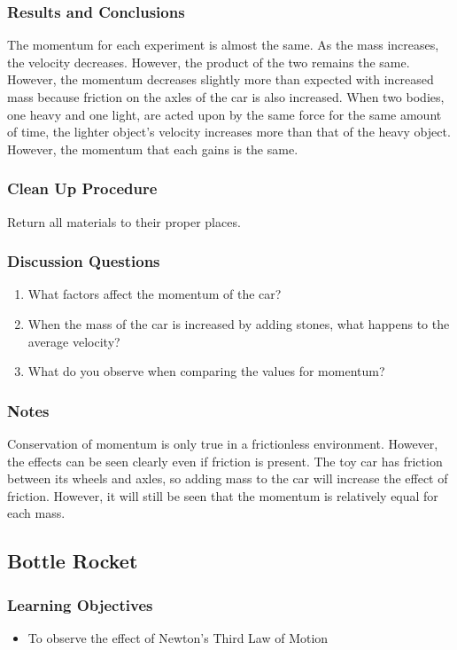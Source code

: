 \subsubsection*{Results and Conclusions}
The momentum for each experiment is almost the same.  As the mass increases, the velocity decreases.  However, the product of the two remains the same.  However, the momentum decreases slightly more than expected with increased mass because friction on the axles of the car is also increased.
When two bodies, one heavy and one light, are acted upon by the same force for the same amount of time, the lighter object's velocity increases more than that of the heavy object.  However, the momentum that each gains is the same.

\subsubsection*{Clean Up Procedure}
Return all materials to their proper places.

\subsubsection*{Discussion Questions}
\begin{enumerate}
\item{What factors affect the momentum of the car?}
\item{When the mass of the car is increased by adding stones, what happens to the average velocity?}
\item{What do you observe when comparing the values for momentum?}
\end{enumerate}

\subsubsection*{Notes}
Conservation of momentum is only true in a frictionless environment.  However, the effects can be seen clearly even if friction is present.  The toy car has friction between its wheels and axles, so adding mass to the car will increase the effect of friction.  However, it will still be seen that the momentum is relatively equal for each mass.

\subsection{Bottle Rocket}

\subsubsection*{Learning Objectives}
\begin{itemize}
\item{To observe the effect of Newton's Third Law of Motion}
\end{itemize}

